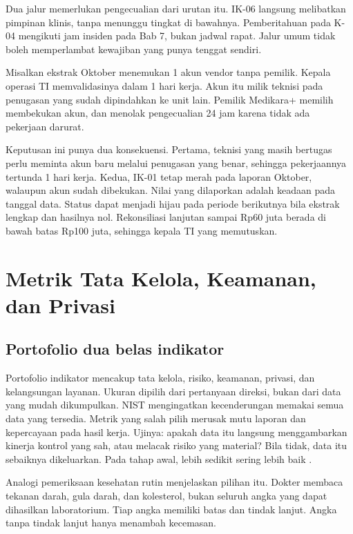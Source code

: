 Dua jalur memerlukan pengecualian dari urutan itu. IK-06 langsung melibatkan pimpinan klinis, tanpa
menunggu tingkat di bawahnya. Pemberitahuan pada K-04 mengikuti jam insiden pada Bab 7, bukan jadwal
rapat. Jalur umum tidak boleh memperlambat kewajiban yang punya tenggat sendiri.

\begin{kasus}[title={Kasus Medikara Health: Satu Akun pada Oktober}]
Misalkan ekstrak Oktober menemukan 1 akun vendor tanpa pemilik. Kepala operasi TI memvalidasinya
dalam 1 hari kerja. Akun itu milik teknisi pada penugasan yang sudah dipindahkan ke unit lain.
Pemilik Medikara+ memilih membekukan akun, dan menolak pengecualian 24 jam karena tidak ada
pekerjaan darurat.

Keputusan ini punya dua konsekuensi. Pertama, teknisi yang masih bertugas perlu meminta akun baru
melalui penugasan yang benar, sehingga pekerjaannya tertunda 1 hari kerja. Kedua, IK-01 tetap merah
pada laporan Oktober, walaupun akun sudah dibekukan. Nilai yang dilaporkan adalah keadaan pada
tanggal data. Status dapat menjadi hijau pada periode berikutnya bila ekstrak lengkap dan hasilnya
nol. Rekonsiliasi lanjutan sampai Rp60 juta berada di bawah batas Rp100 juta, sehingga kepala TI
yang memutuskan.
\end{kasus}

\section{Metrik Tata Kelola, Keamanan, dan Privasi}

\subsection*{Portofolio dua belas indikator}

Portofolio indikator mencakup tata kelola, risiko, keamanan, privasi, dan kelangsungan layanan.
Ukuran dipilih dari pertanyaan direksi, bukan dari data yang mudah dikumpulkan. NIST mengingatkan
kecenderungan memakai semua data yang tersedia. Metrik yang salah pilih merusak mutu laporan dan
kepercayaan pada hasil kerja. Ujinya: apakah data itu langsung menggambarkan kinerja kontrol yang
sah, atau melacak risiko yang material? Bila tidak, data itu sebaiknya dikeluarkan. Pada tahap awal,
lebih sedikit sering lebih baik \cite{c13-nist80055v1}.

Analogi pemeriksaan kesehatan rutin menjelaskan pilihan itu. Dokter membaca tekanan darah, gula
darah, dan kolesterol, bukan seluruh angka yang dapat dihasilkan laboratorium. Tiap angka memiliki
batas dan tindak lanjut. Angka tanpa tindak lanjut hanya menambah kecemasan.

